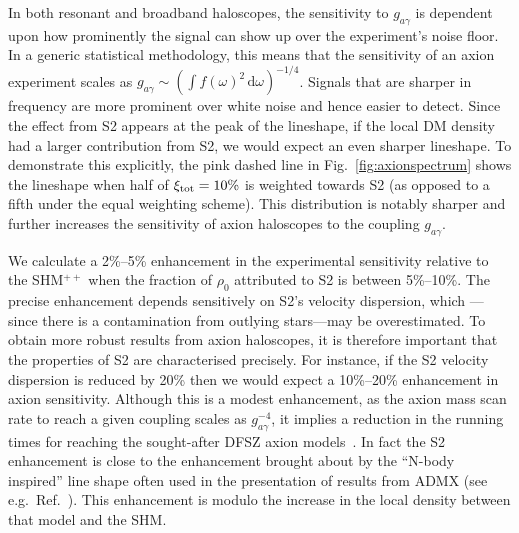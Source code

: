 \documentclass[prd,10pt,twocolumn,showpacs,nofootinbib,aps,superscriptaddress,preprintnumbers]{revtex4-1}
\newcommand{\SHMpp}{SHM$^{++}$\xspace}
\begin{document}
  In both resonant and broadband haloscopes, the sensitivity to
  $g_{a\gamma}$ is dependent upon how prominently the signal can show up
  over the experiment's noise floor. In a generic statistical
  methodology, this means that the sensitivity of an axion experiment
  scales as $g_{a\gamma} \sim (\int
  f(\omega)^2\,\mathrm{d}\omega)^{-1/4}$. Signals that are sharper in
  frequency are more prominent over white noise and hence easier to
  detect. Since the effect from S2 appears at the peak of the lineshape,
  if the local DM density had a larger contribution from S2, we
  would expect an even sharper lineshape.  To demonstrate this
  explicitly, the pink dashed line in Fig.~\ref{fig:axionspectrum} shows
  the lineshape when half of $\xi_{\rm tot} = 10\%$ is weighted towards
  S2 (as opposed to a fifth under the equal weighting scheme). This
  distribution is notably sharper and further increases the
  sensitivity of axion haloscopes to the coupling $g_{a\gamma}$. 
  
We calculate a 2\%--5\% enhancement in the experimental sensitivity relative to the \SHMpp when the fraction of $\rho_0$ attributed to S2 is between 5\%--10\%. 
The precise enhancement depends sensitively on S2's velocity dispersion, which --- since there is a contamination from outlying stars---may be overestimated. 
To obtain more robust results from axion haloscopes, it is therefore important that the properties of S2 are characterised precisely. 
For instance, if the S2 velocity dispersion is reduced by 20\% then we would expect a 10\%--20\% enhancement in axion sensitivity. 
Although this is a modest enhancement, as the axion mass scan rate to reach a given coupling scales as $g^{-4}_{a\gamma}$, it implies a reduction in the running times for reaching the sought-after DFSZ axion models~\cite{Dine:1981rt,Zhitnitsky:1980tq}.
In fact the S2 enhancement is close to the enhancement brought about by the ``N-body inspired'' line shape often used in the presentation of results from ADMX (see e.g.\ Ref.~\cite{Braine:2019fqb}). This enhancement is modulo the increase in the local density between that model and the SHM.
  
\end{document}
